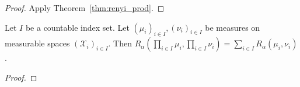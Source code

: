 \begin{proof}%
{}
Apply Theorem~\ref{thm:renyi_prod}.
\end{proof}

\begin{theorem}
  \label{thm:renyi_prod_countable}
  Let $I$ be a countable index set. Let $(\mu_i)_{i \in I}, (\nu_i)_{i \in I}$ be measures on measurable spaces $(\mathcal X_i)_{i \in I}$.
  Then $R_\alpha (\prod_{i \in I} \mu_i, \prod_{i \in I} \nu_i) = \sum_{i \in I} R_\alpha(\mu_i, \nu_i)$.
\end{theorem}

\begin{proof}%
{}
\end{proof}
